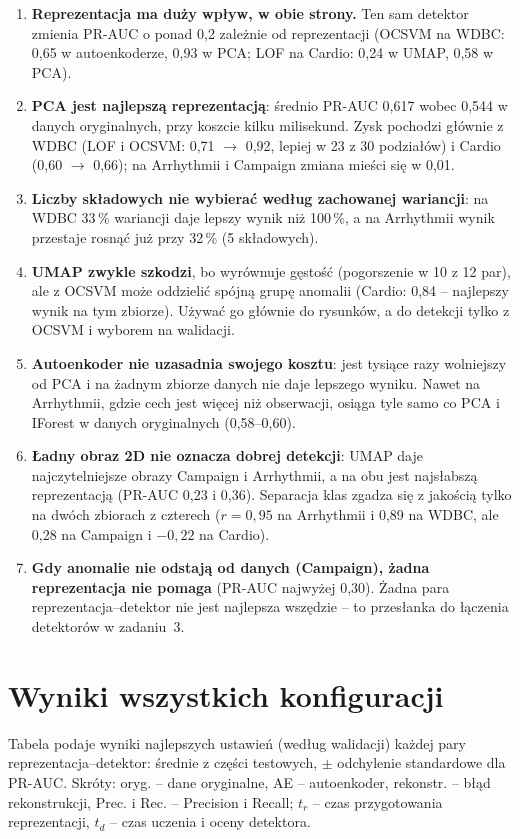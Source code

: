 \documentclass[11pt,a4paper]{article}
\begin{document}
\begin{enumerate}
  \item \textbf{Reprezentacja ma duży wpływ, w obie strony.} Ten sam detektor
  zmienia PR-AUC o ponad 0,2 zależnie od reprezentacji (OCSVM na WDBC: 0,65
  w autoenkoderze, 0,93 w PCA; LOF na Cardio: 0,24 w UMAP, 0,58 w PCA).
  \item \textbf{PCA jest najlepszą reprezentacją}: średnio PR-AUC 0,617 wobec
  0,544 w danych oryginalnych, przy koszcie kilku milisekund. Zysk pochodzi
  głównie z WDBC (LOF i OCSVM: 0,71 $\rightarrow$ 0,92, lepiej w 23 z 30
  podziałów) i Cardio (0,60 $\rightarrow$ 0,66); na Arrhythmii i Campaign
  zmiana mieści się w 0,01.
  \item \textbf{Liczby składowych nie wybierać według zachowanej
  wariancji}: na WDBC 33\,\% wariancji daje lepszy wynik niż 100\,\%,
  a na Arrhythmii wynik przestaje rosnąć już przy 32\,\% (5 składowych).
  \item \textbf{UMAP zwykle szkodzi}, bo wyrównuje gęstość (pogorszenie w 10
  z 12 par), ale z OCSVM może oddzielić spójną grupę anomalii (Cardio: 0,84
  -- najlepszy wynik na tym zbiorze). Używać go głównie do rysunków, a do
  detekcji tylko z OCSVM i wyborem na walidacji.
  \item \textbf{Autoenkoder nie uzasadnia swojego kosztu}: jest tysiące razy
  wolniejszy od PCA i na żadnym zbiorze danych nie daje lepszego wyniku.
  Nawet na Arrhythmii, gdzie cech jest więcej niż obserwacji, osiąga tyle samo
  co PCA i IForest w danych oryginalnych (0,58--0,60).
  \item \textbf{Ładny obraz 2D nie oznacza dobrej detekcji}: UMAP daje
  najczytelniejsze obrazy Campaign i Arrhythmii, a na obu jest najsłabszą
  reprezentacją (PR-AUC 0,23 i 0,36). Separacja klas zgadza się z jakością
  tylko na dwóch zbiorach z czterech ($r=0{,}95$ na Arrhythmii i 0,89 na
  WDBC, ale 0,28 na Campaign i $-0{,}22$ na Cardio).
  \item \textbf{Gdy anomalie nie odstają od danych (Campaign), żadna
  reprezentacja nie pomaga} (PR-AUC najwyżej 0,30). Żadna para
  reprezentacja--detektor nie jest najlepsza wszędzie -- to przesłanka do
  łączenia detektorów w zadaniu~3.
\end{enumerate}

\appendix
\FloatBarrier
\section{Wyniki wszystkich konfiguracji}
\label{app:full}

Tabela podaje wyniki najlepszych ustawień (według walidacji) każdej pary
reprezentacja--detektor: średnie z części testowych, $\pm$ odchylenie
standardowe dla PR-AUC. Skróty: oryg. -- dane oryginalne, AE -- autoenkoder,
rekonstr. -- błąd rekonstrukcji, Prec. i Rec. -- Precision i Recall; $t_r$ --
czas przygotowania reprezentacji, $t_d$ -- czas uczenia i oceny detektora.

{\footnotesize
\setlength{\tabcolsep}{2pt}
}
\end{document}
